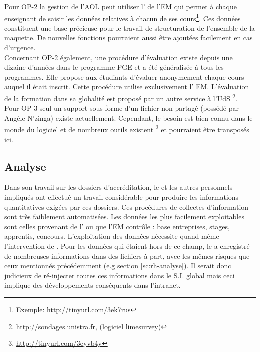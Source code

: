 \documentclass{book}
\begin{document}
Pour OP-2 la gestion de l'AOL peut utiliser l' de l'EM qui
permet à chaque enseignant de saisir les données relatives à chacun de ses 
cours\footnote{Exemple: \url{http://tinyurl.com/3ek7rus}}. Ces données 
constituent une base précieuse pour le travail de structuration de l'ensemble
de la maquette. De nouvelles fonctions pourraient aussi être ajoutées facilement
en cas d'urgence.\\

Concernant OP-2 également, une procédure  d'évaluation existe depuis une dizaine
d'années dans le programme PGE et a  été généralisée à tous les programmes. Elle
propose  aux  étudiants  d'évaluer  anonymement chaque  cours  auquel  il  était
inscrit.    Cette  procédure   utilise  exclusivement   l'  EM.
L'évaluation de la formation dans sa  globalité est proposé par un autre service
à l'UdS%
\footnote{\url{http://sondages.unistra.fr}, (logiciel limesurvey)}.\\

Pour OP-3  seul un support  sous forme  d'un fichier   non partagé
(possédé par Angèle N'zinga) existe  actuellement. Cependant, le besoin est bien
connu dans le monde du logiciel et de nombreux outils existent%
\footnote{\url{http://tinyurl.com/3eyvb4y}}
et pourraient être transposés ici.


\subsection{Analyse}
\label{sc:sop-analyse}

Dans  son travail  sur  les  dossiers d'accréditation,  le  \sop  et les  autres
personnels  impliqués ont  effectué un  travail considérable  pour produire  les
informations quantitatives exigées par ces dossiers. Ces procédures de collectes
d'information sont très faiblement automatisées. Les données les plus facilement
exploitables sont celles provenant de l' ou que l'EM contrôle :
base  entreprises,  stages,  apprentis, concours.   L'exploitation  des  données
nécessite quand même  l'intervention de \CK.  Pour les données  qui étaient hors
de ce champ, le \sop a enregistré de nombreuses informations dans des fichiers à
part,  avec les  mêmes risques  que  ceux mentionnés  précédemment (e.g  section
\ref{sc:rh-analyse}).   Il  serait  donc  judicieux de  ré-injecter  toutes  ces
informations  dans  le  S.I.   global  mais  ceci  implique  des  développements
conséquents dans l'intranet.\\
\end{document}
